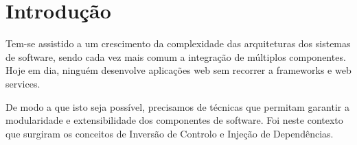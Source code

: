\section{Introdução}

Tem-se assistido a um crescimento da complexidade das arquiteturas dos sistemas de software, sendo cada vez mais comum a integração de múltiplos componentes. Hoje em dia, ninguém desenvolve aplicações web sem recorrer a frameworks e web services.

De modo a que isto seja possível, precisamos de técnicas que permitam garantir a modularidade e extensibilidade dos componentes de software. Foi neste contexto que surgiram os conceitos de Inversão de Controlo e Injeção de Dependências.
